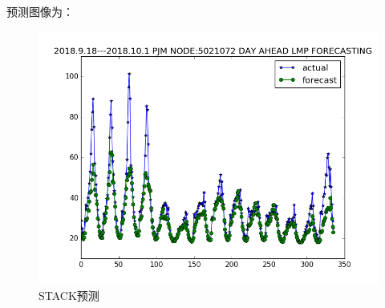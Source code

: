 \documentclass[UTF-8, 10pt]{ctexart}
\begin{document}
                \indent{}预测图像为：\\
                \begin{figure}[H]                                        %
                    \centering                                                      %
                    \includegraphics[width = .8\textwidth]{STACK.png}            %
                    \caption{STACK预测}\label{1}                               %
                    \end{figure}
\end{document}

